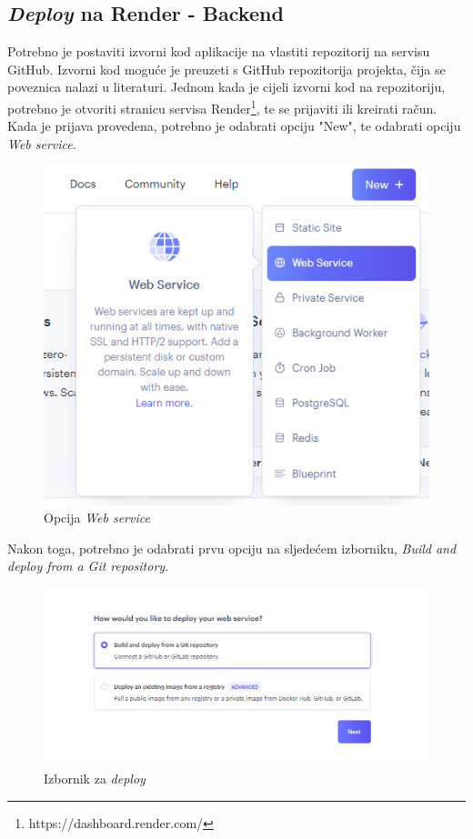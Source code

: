 			\subsection{\textit{Deploy} na Render - Backend}
			Potrebno je postaviti izvorni kod aplikacije na vlastiti repozitorij na servisu GitHub. Izvorni kod moguće je preuzeti s GitHub repozitorija projekta, čija se poveznica nalazi u literaturi. Jednom kada je cijeli izvorni kod na repozitoriju, potrebno je otvoriti stranicu servisa Render\footnote{https://dashboard.render.com/}, te se prijaviti ili kreirati račun. Kada je prijava provedena, potrebno je odabrati opciju "New", te odabrati opciju \textit{Web service}.
			\begin{figure}[H]
				\includegraphics[scale=0.9]{slike/render0.PNG} %
				\centering
				\caption{Opcija \textit{Web service}}
				\label{fig:render0}
			\end{figure}
			Nakon toga, potrebno je odabrati prvu opciju na sljedećem izborniku, \textit{Build and deploy from a Git repository}.
			\begin{figure}[H]
				\includegraphics[scale=0.7]{slike/render1.PNG} %
				\centering
				\caption{Izbornik za \textit{deploy}}
				\label{fig:render1}
			\end{figure}
